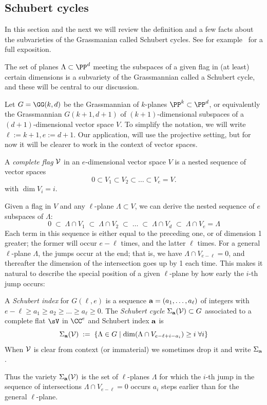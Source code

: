 \subsection{Schubert cycles}\label{Schubert1}

In this section and the next we will review the definition and a few facts about the subvarieties of the Grassmanian called Schubert cycles.
See for example~\cite[Chapters 3 and 4]{3264} for a full exposition.

The set of planes $\Lambda \subset \PP^d$ meeting  the subspaces of a given flag in (at least) certain dimensions
is a subvariety of the Grassmannian called a Schubert cycle, and these will be central to our discussion.

Let $G = \GG(k, d)$ be the Grassmannian of $k$-planes $\PP^k \subset \PP^d$, or equivalently the Grassmannian $G(k+1,d+1)$ of $(k+1)$-dimensional subspaces of a $(d+1)$-dimensional vector space $V$.
To simplify the notation, we will write $\ell := k+1, e:= d+1$.
Our application, will use the projective setting, but for now it will be clearer to work in the context  of vector spaces.

\begin{definition}
A \emph{complete flag} $\cal V$  in an $e$-dimensional vector space $V$ is a nested sequence of vector spaces
$$
0 \subset V_1 \subset V_2 \subset \dots  \subset V_{e} = V.
$$
with $\dim V_i = i$.
\end{definition}

Given a flag in $V$ and any  $\ell$-plane $\Lambda \subset V$, we can derive the nested sequence of $e$ subspaces of $\Lambda$:
$$
0 \; \subset \; \Lambda \cap V_1 \; \subset \;  \Lambda \cap V_2 \; \subset \;  \dots \; \subset \;  \Lambda \cap V_d \; \subset \;  \Lambda \cap V_{e} = \Lambda
$$
Each term in this sequence is either equal to the preceding one, or of dimension 1 greater; the former will occur $e-\ell$ times, and the latter $\ell$ times. For a general $\ell $-plane $\Lambda$, the jumps occur at the end; that is, we have $\Lambda \cap V_{e-\ell} = 0$, and thereafter the dimension of the intersection goes up by 1 each time. This makes it natural
to describe the special position of a given $\ell $-plane by how early the $i$-th jump occurs: 

\begin{definition}
A \emph{Schubert index} for $G(\ell, e)$ is a sequence ${\bf a} = (a_1,\dots,a_{\ell})$ of integers with $e-\ell \geq a_1 \geq a_2 \geq \dots \geq a_{\ell} \geq 0$.
The \emph{Schubert cycle $\Sigma_{\bf a}({\cal V}) \subset G$} associated to a complete flat $\sV$ in $\CC^e$ and
Schubert index $\bf a$  is 
$$
\Sigma_{\bf a}({\cal V}) \; := \; \left\{ \Lambda \in G \mid \dim(\Lambda \cap V_{e-\ell+i-a_i}) \geq i \; \forall i \right\}
$$
When $\cal V$ is clear from context (or immaterial) we sometimes drop it and write $\Sigma_{\bf a}$.
\end{definition}
Thus the variety  $\Sigma_{\bf a}({\cal V})$ is the set of $\ell $-planes $\Lambda$ for which the $i$-th jump in the sequence of intersections $\Lambda \cap V_{e-\ell} = 0$ occurs
$a_i$ steps earlier than for the general $\ell $-plane. 

